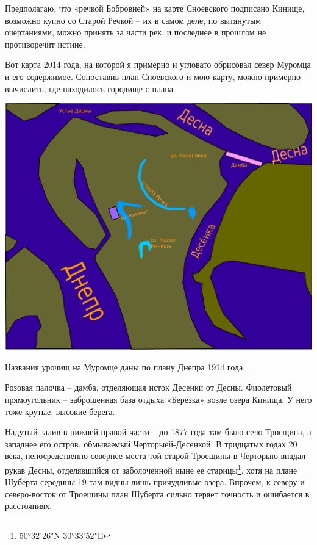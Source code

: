 Предполагаю, что «речкой Бобровней» на карте Сноевского подписано Кинище, возможно купно со Старой Речкой – их в самом деле, по вытянутым очертаниями, можно принять за части рек, и последнее в прошлом не противоречит истине.

Вот карта 2014 года, на которой я примерно и угловато обрисовал север Муромца и его содержимое. Сопоставив план Сноевского и мою карту, можно примерно вычислить, где находилось городище с плана.

\begin{center}
\includegraphics[width=\linewidth]{chast-gorodki/cherto/mur-nord-map.pdf}
\end{center}

Названия урочищ на Муромце даны по плану Днепра 1914 года.

Розовая палочка – дамба, отделяющая исток Десенки от Десны. Фиолетовый прямоугольник – заброшенная база отдыха «Березка» возле озера Кинища. У него тоже крутые, высокие берега.

Надутый залив в нижней правой части – до 1877 года там было село Троещина, а западнее его остров, обмываемый Черторыей-Десенкой. В тридцатых годах 20 века, непосредственно севернее места той старой Троещины в Черторыю впадал рукав Десны, отделявшийся от заболоченной ныне ее старицы\footnote{50°32'26"N 30°33'52"E}, хотя на плане Шуберта середины 19 там видны лишь причудливые озера. Впрочем, к северу и северо-восток от Троещины план Шуберта сильно теряет точность и ошибается в расстояниях.

  
